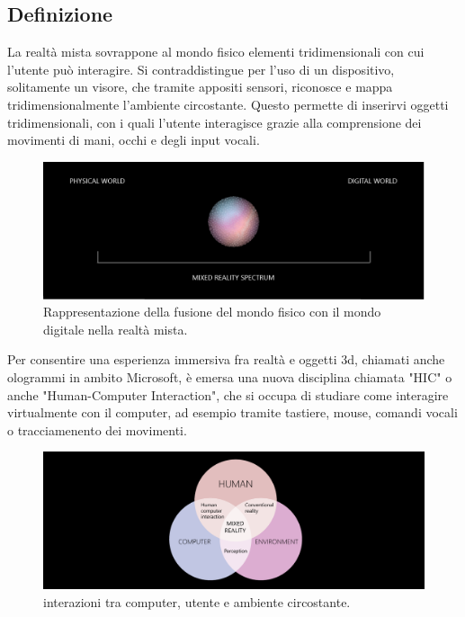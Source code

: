\subsection{Definizione}
La realtà mista sovrappone al mondo fisico elementi tridimensionali con cui l'utente può interagire. Si contraddistingue per l'uso di un dispositivo, solitamente un visore, che tramite appositi sensori, riconosce e mappa tridimensionalmente l'ambiente circostante. Questo permette di inserirvi oggetti tridimensionali, con i quali l'utente interagisce grazie alla comprensione dei movimenti di mani, occhi e degli input vocali.
\begin{figure}[H]
    \includegraphics[scale=0.4]{figures/chapter_1/mixedrealityspectrum-worlds.png}
    \caption{Rappresentazione della fusione del mondo fisico con il mondo digitale nella realtà mista.}
    \centering
\end{figure}

Per consentire una esperienza immersiva fra realtà e oggetti 3d, chiamati anche ologrammi in ambito Microsoft, è emersa una nuova disciplina chiamata "HIC" o anche "Human-Computer Interaction", che si occupa di studiare come interagire virtualmente con il computer, ad esempio tramite tastiere, mouse, comandi vocali o tracciamenento dei movimenti. \cite{MixedRealityDefinition}

\begin{figure}[H]
    \includegraphics[scale=0.4]{figures/chapter_1/mixed-reality-venn-diagram.png}
    \caption{interazioni tra computer, utente e ambiente circostante.}
    \centering
\end{figure}
    
